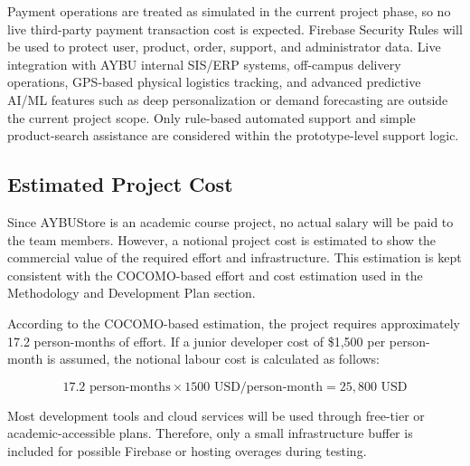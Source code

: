 \documentclass[11pt,a4paper]{article}
\begin{document}
Payment operations are treated as simulated in the current project phase, so
no live third-party payment transaction cost is expected. Firebase Security
Rules will be used to protect user, product, order, support, and administrator
data. Live integration with AYBU internal SIS/ERP systems, off-campus delivery
operations, GPS-based physical logistics tracking, and advanced predictive
AI/ML features such as deep personalization or demand forecasting are outside
the current project scope. Only rule-based automated support and simple
product-search assistance are considered within the prototype-level support
logic.
 
\subsection{Estimated Project Cost}
 
Since AYBUStore is an academic course project, no actual salary will be paid
to the team members. However, a notional project cost is estimated to show the
commercial value of the required effort and infrastructure. This estimation
is kept consistent with the COCOMO-based effort and cost estimation used in
the Methodology and Development Plan section.
 
According to the COCOMO-based estimation, the project requires approximately
17.2 person-months of effort. If a junior developer cost of \$1{,}500 per
person-month is assumed, the notional labour cost is calculated as follows:
 
\[
17.2 \text{ person-months} \times 1500 \text{ USD/person-month}
= 25{,}800 \text{ USD}
\]
 
Most development tools and cloud services will be used through free-tier or
academic-accessible plans. Therefore, only a small infrastructure buffer is
included for possible Firebase or hosting overages during testing.
 
\end{document}
